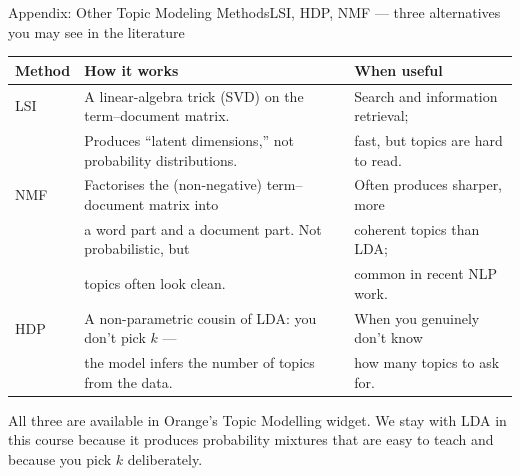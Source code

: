 \documentclass[aspectratio=169,10pt]{beamer}
\begin{document}
\begin{frame}{Appendix: Other Topic Modeling Methods}{LSI, HDP, NMF --- three alternatives you may see in the literature}
  \begin{center}
    \small
    \begin{tabular}{@{}l l l@{}}
      \toprule
      \textbf{Method} & \textbf{How it works}                                  & \textbf{When useful} \\
      \midrule
      LSI & A linear-algebra trick (SVD) on the term--document matrix.       & Search and information retrieval; \\
          & Produces ``latent dimensions,'' not probability distributions.    & fast, but topics are hard to read. \\[0.4em]
      NMF & Factorises the (non-negative) term--document matrix into          & Often produces sharper, more \\
          & a word part and a document part. Not probabilistic, but           & coherent topics than LDA; \\
          & topics often look clean.                                          & common in recent NLP work. \\[0.4em]
      HDP & A non-parametric cousin of LDA: you don't pick $k$ ---             & When you genuinely don't know \\
          & the model infers the number of topics from the data.              & how many topics to ask for. \\
      \bottomrule
    \end{tabular}
  \end{center}

  \vspace{0.6em}
  All three are available in Orange's Topic Modelling widget. We stay with LDA in this course because it
  produces probability mixtures that are easy to teach and because you pick $k$ deliberately.
\end{frame}
\end{document}
